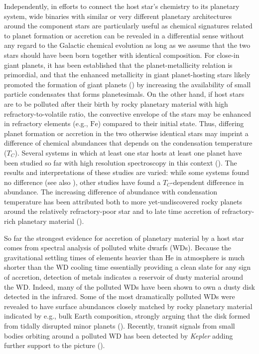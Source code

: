 \documentclass[modern, letterpaper]{aastex61}
\newcommand{\project}[1]{\textsl{#1}}
\newcommand*\elem[1]{\ensuremath{\mathrm{#1}}}
\newcommand{\Tcondens}{\ensuremath{T_C}}
\begin{document}
Independently, in efforts to connect the host star's chemistry to
its planetary system, wide binaries with similar or very different planetary architectures around
the component stars are particularly useful as chemical signatures related to planet formation or accretion
can be revealed in a differential sense without any regard to the Galactic chemical evolution
as long as we assume that the two stars should have been born together with identical composition.
For close-in giant planets, it has been established that the planet-metallicity relation
is primordial, and that the enhanced metallicity in giant planet-hosting stars likely
promoted the formation of giant planets (\citealt{Fischer:2005aa}) by increasing
the availability of small particle condensates that forms planetesimals.
On the other hand, if host stars are to be polluted after their birth
by rocky planetary material with high refractory-to-volatile ratio,
the convective envelope of the stars may be enhanced in refractory elements (e.g., \elem{Fe})
compared to their initial state.
Thus, differing planet formation or accretion in the two otherwise identical stars
may imprint a difference of chemical abundances that depends on the
condensation temperature (\Tcondens).
Several systems in which at least one star hosts at least one planet
have been studied so far with high resolution spectroscopy in this context
(\citealt{Teske:2013aa,Mack:2014aa,Liu:2014aa,Teske:2015aa,Saffe:2015aa,
  Ramirez:2015aa,Biazzo:2015aa,Mack:2016aa,Teske:2016aa,Teske:2016ab}).
The results and interpretations of these studies are varied: while some systems
found no difference (see also \citealt{Desidera:2004aa,Gratton:2001aa}), other
studies  have found a \Tcondens-dependent difference in abundance.
The increasing difference of abundance with condensation temperature
has been attributed both to more yet-undiscovered rocky planets around
the relatively refractory-poor star and to late time accretion of
refractory-rich planetary material (\citealt{Ramirez:2015aa,Biazzo:2015aa}).

So far the strongest evidence for accretion of planetary material by a host star comes
from spectral analysis of polluted white dwarfs (WDs).
Because the gravitational settling times of elements heavier than \elem{He} in
atmosphere is much shorter than the WD cooling time essentially providing a
clean slate for any sign of accretion, detection of metals indicates a
reservoir of dusty material around the WD.
Indeed, many of the polluted WDs have been shown to own a dusty disk detected
in the infrared.
Some of the most dramatically polluted WDs were revealed to have
surface abundances closely matched by rocky planetary material
indicated by e.g., bulk Earth composition, strongly arguing
that the disk formed from tidally disrupted minor planets
(\citealt{Zuckerman:2007aa,Klein:2010aa}).
Recently, transit signals from small bodies orbiting around a polluted WD
has been detected by \project{Kepler} adding further support to the picture
(\citealt{2015Natur.526..546V}).
\end{document}
